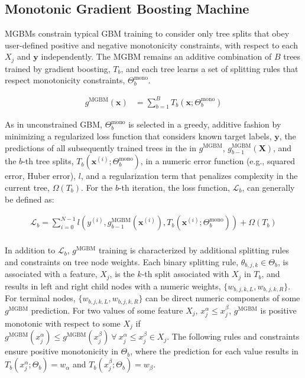 \documentclass[information,article,submit,moreauthors,pdftex]{definitions/mdpi}
\begin{document}
\subsection{Monotonic Gradient Boosting Machine}\label{ssec:mgbm}

MGBMs constrain typical GBM training to consider only tree splits that obey user-defined positive and negative monotonicity constraints, with respect to each $X_j$ and $\mathbf{y}$ independently. The MGBM remains an additive combination of $B$ trees trained by gradient boosting, $T_b$, and each tree learns a set of splitting rules that respect monotonicity constraints,  $\Theta^\text{mono}_b$. 

\begin{equation}
\begin{aligned}\label{eq:gbm}
g^{\text{MGBM}}(\mathbf{x}) &= \sum_{b=1}^B T_b\left(\mathbf{x}; \Theta^\text{mono}_b\right)
\end{aligned}
\end{equation}

\noindent As in unconstrained GBM, $\Theta^{\text{mono}}_b$ is selected in a greedy, additive fashion by minimizing a regularized loss function that considers known target labels, $\mathbf{y}$, the predictions of all subsequently trained trees in the in $g^{\text{MGBM}}$, $g^{\text{MGBM}}_{b-1}(\mathbf{X})$, and the $b$-th tree splits, $T_b(\mathbf{x}^{(i)};\Theta^\text{mono}_b)$, in a numeric error function (e.g., squared error, Huber error), $l$, and a regularization term that penalizes complexity in the current tree, $\Omega(T_b)$. For the $b$-th iteration, the loss function, $\mathcal{L}_{b}$, can generally be defined as:

\begin{equation}
\begin{aligned}
\mathcal{L}_{b} =\sum_{i=0}^{N-1}l(y^{(i)}, g^{\text{MGBM}}_{b-1}(\mathbf{x}^{(i)}), T_b(\mathbf{x}^{(i)};\Theta^\text{mono}_b)) + \Omega(T_b)\\
\end{aligned}
\end{equation}

\noindent In addition to $\mathcal{L}_{b}$, $g^\text{MGBM}$ training is characterized by additional splitting rules and constraints on tree node weights. Each binary splitting rule, $\theta_{b,j,k} \in \Theta_b$, is associated with a feature, $X_j$, is the $k$-th split associated with $X_j$ in $T_b$, and results in left and right child nodes with a numeric weights, $\{w_{b,j,k,L}, w_{b,j,k,R}\}$. For terminal nodes, $\{w_{b,j,k,L}, w_{b,j,k,R}\}$ can be direct numeric components of some $g^\text{MGBM}$ prediction. For two values of some feature $X_j$, $x^{\alpha}_j \le x^{\beta}_j$, $g^{\text{MGBM}}$ is positive monotonic with respect to some $X_j$ if $g^{\text{MGBM}}(x^{\alpha}_j) \le g^{\text{MGBM}}(x^{\beta}_j) ~\forall ~x^{\alpha}_j \le x^{\beta}_j \in X_j$. The following rules and constraints ensure positive monotonicity in $\Theta_b$, where the prediction for each value results in $T_b(x^{\alpha}_j; \Theta_b) = w_\alpha$ and $T_b(x^{\beta}_j; \Theta_b) = w_\beta$.
\end{document}
